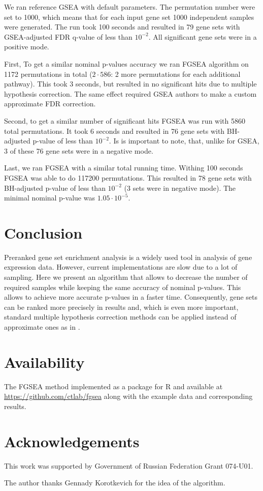 \documentclass[runningheads,a4paper]{llncs}
\begin{document}
We ran reference GSEA with default parameters. The permutation number 
were set to 1000, which means that for each input gene set 1000 independent
samples were generated. The run took 100 seconds and resulted
in 79 gene sets with GSEA-adjusted FDR q-value of less than $10^{-2}$. All
significant gene sets were in a positive mode.

First, To get a similar nominal p-values accuracy we ran FGSEA algorithm on
1172 permutations in total ($2\cdot586$: 2 more permutations for each 
additional pathway). This took 3 seconds, but resulted
in no significant hits due to multiple hypothesis correction. The same
effect required GSEA authors to make a custom approximate FDR correction.

Second, to get a similar number of significant hits FGSEA
was run with 5860 total permutations.
It took 6 seconds and resulted in 
76 gene sets with BH-adjusted p-value of less than $10^{-2}$. Is is important
to note, that, unlike for GSEA, 3 of these 76 gene sets were in a negative mode.

Last, we ran FGSEA with a similar total running time. Withing 100 seconds
FGSEA was able to do 117200 permutations. This resulted in
78 gene sets with BH-adjusted p-value of less than $10^{-2}$ (3 sets
were in negative mode). The minimal nominal p-value was $1.05\cdot10^{-5}$. 

\section{Conclusion}

Preranked gene set enrichment analysis is a widely used tool in analysis of
gene expression data. However, current implementations are slow due to 
a lot of sampling. Here we present an algorithm that allows to decrease
the number of required samples while keeping the same accuracy 
of nominal p-values. This allows to achieve more accurate p-values
in a faster time. Consequently, gene sets can be ranked more
precisely in results and, which is even more important, 
standard multiple hypothesis
correction methods can be applied instead of approximate ones
as in \cite{Subramanian2005}. 

\section*{Availability}\label{secion_availability}

The FGSEA method implemented as a package for R and available at 
\url{https://github.com/ctlab/fgsea} along with the example data
and corresponding results.

\section*{Acknowledgements}\label{secion_acknowledgements}

This work was supported by Government of Russian Federation Grant 074-U01.

The author thanks Gennady Korotkevich for the idea of the algorithm.

{}

\end{document}
